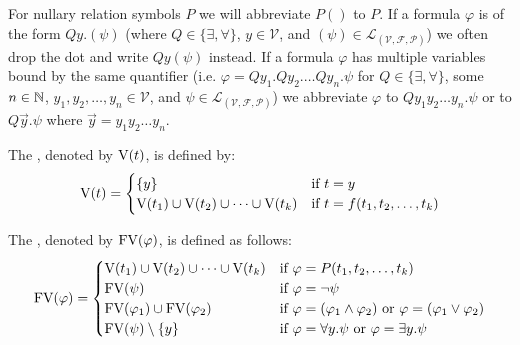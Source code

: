 For nullary relation symbols $P$ we will abbreviate $P()$ to $P$. If a formula $\varphi$ is of the form $Qy.(\psi)$ (where $Q\in\{\exists,\forall\}$, $y\in\mathcal{V}$, and $(\psi)\in\mathcal{L}_{(\mathcal{V},\mathcal{F},\mathcal{P})}$) we often drop the dot and write $Qy(\psi)$ instead. %
If a formula $\varphi$ has multiple variables bound by the same quantifier (i.e. $\varphi=Qy_1.Qy_2.\dots Qy_n.\psi$ for $Q\in\{\exists,\forall\}$, some $n\in\mathbb{N}$, $y_1,y_2,\dots,y_n\in\mathcal{V}$, and $\psi\in\mathcal{L}_{(\mathcal{V},\mathcal{F},\mathcal{P})}$) we abbreviate $\varphi$ to $Qy_1y_2\dots y_n.\psi$ or to $Q\vec{y}.\psi$ where $\vec{y}=y_1y_2\dots y_n$.

\begin{definition}\label{def.2.17}
	The , denoted by $\text{V}(t)$, is defined by:
	\[\V(t)=
		\begin{cases}
			\{y\}                                    & \text{if $t=y$}                    \\ %
			\V(t_1)\cup \V(t_2)\cup\dots\cup \V(t_k) & \text{if $t=f(t_1,t_2,\dots,t_k)$} 
		\end{cases}\]
	
	The , denoted by $\text{FV}(\varphi)$, is defined as follows:
	\[\FV(\varphi)=
		\begin{cases} %
			\V(t_1)\cup \V(t_2)\cup\dots\cup \V(t_k) & \text{if $\varphi=P(t_1,t_2,\dots,t_k)$}                               \\
			\FV(\psi)                                 & \text{if $\varphi=\neg\psi$}                               \\
			\FV(\varphi_1)\cup\FV(\varphi_2)         & \text{if $\varphi=(\varphi_1\wedge\varphi_2)$ or $\varphi=(\varphi_1\vee\varphi_2)$} \\
			\FV(\psi)\setminus\{y\}                  & \text{if $\varphi=\forall y.\psi$ or $\varphi=\exists y.\psi$}                 
		\end{cases}\]
\end{definition}

